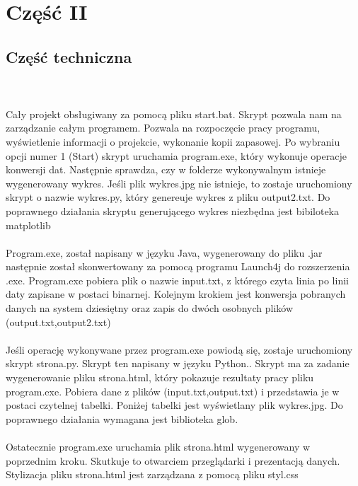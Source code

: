 \documentclass[12pt,a4paper]{article}
\begin{document}
		
	
	
\newpage
	\section*{Część II}
	\subsection*{Część techniczna}
\\
\\
Cały projekt obsługiwany za pomocą pliku start.bat. Skrypt pozwala nam na zarządzanie całym programem. Pozwala na rozpoczęcie pracy programu, wyświetlenie informacji o projekcie, wykonanie kopii zapasowej. Po wybraniu opcji numer 1 (Start) skrypt uruchamia program.exe, który wykonuje operacje konwersji dat. Następnie sprawdza, czy w folderze wykonywalnym istnieje wygenerowany wykres. Jeśli plik wykres.jpg nie istnieje, to zostaje uruchomiony skrypt o nazwie wykres.py, który genereuje wykres z pliku output2.txt. Do poprawnego działania skryptu generującego wykres niezbędna jest bibiloteka matplotlib
\\
\\
Program.exe, został napisany w języku Java, wygenerowany do pliku .jar następnie został skonwertowany za pomocą programu Launch4j do rozszerzenia .exe. Program.exe pobiera plik o nazwie input.txt, z którego czyta linia po linii daty zapisane w postaci binarnej. Kolejnym krokiem jest konwersja pobranych danych na system dziesiętny oraz zapis do dwóch osobnych plików (output.txt,output2.txt)
\\
\\
Jeśli operację wykonywane przez program.exe powiodą się, zostaje uruchomiony skrypt strona.py. Skrypt ten napisany w języku Python.. Skrypt ma za zadanie wygenerowanie pliku strona.html, który pokazuje rezultaty pracy pliku program.exe. Pobiera dane z plików (input.txt,output.txt) i przedstawia je w postaci czytelnej tabelki. Poniżej tabelki jest wyświetlany plik wykres.jpg. Do poprawnego działania wymagana jest biblioteka glob.
\\
\\
Ostatecznie program.exe uruchamia plik strona.html wygenerowany w poprzednim kroku. Skutkuje to otwarciem przeglądarki i prezentacją danych. Stylizacja pliku strona.html jest zarządzana z pomocą pliku styl.css


	\newpage
\end{document}
